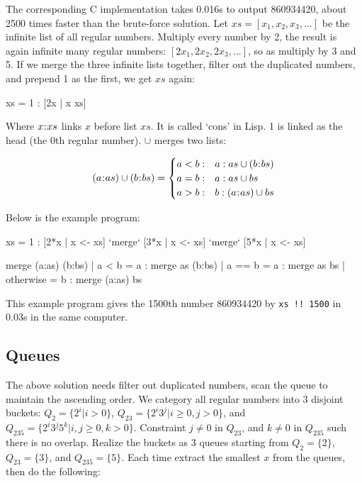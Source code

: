 \documentclass[b5paper]{article}
\begin{document}
The corresponding C implementation takes 0.016s to output 860934420, about 2500 times faster than the brute-force solution. Let $xs = [x_1, x_2, x_3, ...]$ be the infinite list of all regular numbers. Multiply every number by 2, the result is again infinite many regular numbers: $[2x_1, 2x_2, 2x_3, ...]$, so as multiply by 3 and 5. If we merge the three infinite lists together, filter out the duplicated numbers, and prepend 1 as the first, we get $xs$ again:

\be
  xs = 1 : [2x | x \gets xs] \cup [3x | x \gets xs] \cup [5x | x \gets xs]
\ee

Where $x \mathbin{\!:\!} xs$ links $x$ before list $xs$. It is called `cons' in Lisp. 1 is linked as the head (the 0th regular number). $\cup$ merges two lists:

\[
(a \cons as) \cup (b \cons bs) = \begin{cases}
  a < b: & a : as \cup (b \cons bs) \\
  a = b: & a : as \cup bs \\
  a > b: & b : (a \cons as) \cup bs \\
\end{cases}
\]

Below is the example program:

\begin{Haskell}
xs = 1 : [2*x | x <- xs] `merge` [3*x | x <- xs] `merge` [5*x | x <- xs]

merge (a:as) (b:bs) | a < b = a : merge as (b:bs)
                    | a == b = a : merge as bs
                    | otherwise = b : merge (a:as) bs
\end{Haskell}

This example program gives the 1500th number 860934420 by \texttt{xs !! 1500} in 0.03s in the same computer.

\subsection*{Queues}
The above solution needs filter out duplicated numbers, scan the queue to maintain the ascending order. We category all regular numbers into 3 disjoint buckets: $Q_2 = \{2^i | i > 0\}$, $Q_{23} = \{ 2^i3^j | i \geq 0, j > 0 \}$, and $Q_{235} = \{ 2^i3^j5^k | i,j \geq 0, k > 0\}$. Constraint $j \neq 0$ in $Q_{23}$, and $k \neq 0$ in $Q_{235}$ such there is no overlap. Realize the buckets as 3 queues starting from $Q_2 = \{ 2 \}$, $Q_{23} = \{ 3\}$, and $Q_{235} = \{ 5 \}$. Each time extract the smallest $x$ from the queues, then do the following:
\end{document}
